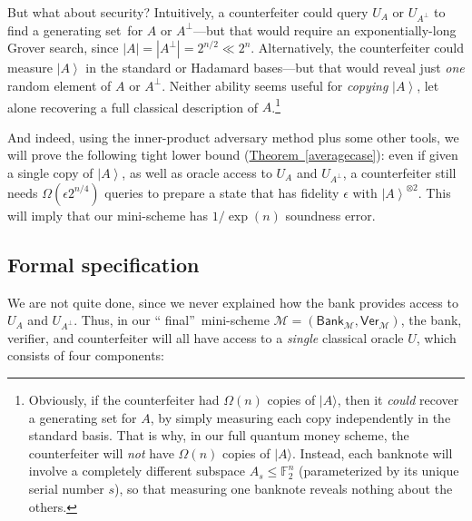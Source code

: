 \documentclass[10pt]{article}
\theoremstyle{definition}
\numberwithin{equation}{section}
\newcommand{\expref}[2]{\texorpdfstring{\hyperref[#2]{#1~\ref{#2}}}{#1~\ref{#2}}}
\begin{document}
But what about security? Intuitively, a counterfeiter could query $U_{A}$ or
$U_{A^{\bot}}$ to find a generating set\ for $A$ or $A^{\bot}$---but that
would require an exponentially-long Grover search, since $\left\vert
A\right\vert =\left\vert A^{\bot}\right\vert =2^{n/2}\ll2^{n}$. Alternatively,
the counterfeiter could measure $\left\vert A\right\rangle $ in the standard
or Hadamard bases---but that would reveal just \emph{one} random element of
$A$ or $A^{\bot}$. Neither ability seems useful for \emph{copying}
$\left\vert A\right\rangle $, let alone recovering a full classical
description of $A$.\footnote{Obviously, if the counterfeiter had
$\Omega(  n)$ copies of $\vert A\rangle $, then it
\emph{could} recover a generating set for $A$, by simply measuring each copy
independently in the standard basis. That is why, in our full quantum money
scheme, the counterfeiter will \emph{not} have $\Omega(n)$ copies of $\vert A\rangle$. Instead, each banknote will
involve a completely different subspace $A_{s}\leq\mathbb{F}_{2}^{n}$
(parameterized by its unique serial number $s$), so that measuring one
banknote reveals nothing about the others.}

And indeed, using the inner-product adversary method plus some other tools, we
will prove the following tight lower bound (\expref{Theorem}{averagecase}): even
if given a single copy of $\left\vert A\right\rangle $, as well as oracle
access to $U_{A}$ and $U_{A^{\bot}}$, a counterfeiter still needs
$\Omega\left(\epsilon2^{n/4}\right)$ queries to prepare a state that
has fidelity $\epsilon$ with $\left\vert A\right\rangle ^{\otimes2}%
$. This will imply that our mini-scheme has $1/\exp(n)$ soundness error.

\subsection{Formal specification\label{SPEC}}

We are not quite done, since we never explained how the bank provides access
to $U_{A}$ and $U_{A^{\bot}}$. Thus, in our \textquotedblleft
final\textquotedblright\ mini-scheme $\mathcal{M}=\left(  \mathsf{Bank}%
_{\mathcal{M}},\mathsf{Ver}_{\mathcal{M}}\right)  $, the bank, verifier, and
counterfeiter will all have access to a \emph{single} classical oracle $U$,
which consists of four components:
\end{document}
